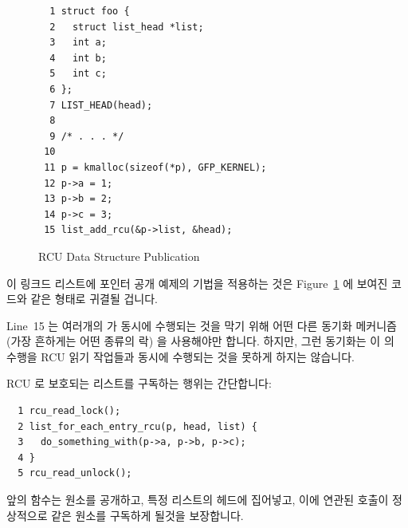 \begin{figure}[tbp]
{ \scriptsize
\begin{verbatim}
  1 struct foo {
  2   struct list_head *list;
  3   int a;
  4   int b;
  5   int c;
  6 };
  7 LIST_HEAD(head);
  8
  9 /* . . . */
 10
 11 p = kmalloc(sizeof(*p), GFP_KERNEL);
 12 p->a = 1;
 13 p->b = 2;
 14 p->c = 3;
 15 list_add_rcu(&p->list, &head);
\end{verbatim}
}
\caption{RCU Data Structure Publication}
\label{fig:defer:RCU Data Structure Publication}
\end{figure}

이 링크드 리스트에 포인터 공개 예제의 기법을 적용하는 것은
Figure~\ref{fig:defer:RCU Data Structure Publication} 에 보여진 코드와 같은
형태로 귀결될 겁니다.

Line~15 는 여러개의  가 동시에 수행되는 것을 막기 위해 어떤
다른 동기화 메커니즘 (가장 흔하게는 어떤 종류의 락) 을 사용해야만 합니다.
하지만, 그런 동기화는 이  의 수행을 RCU 읽기 작업들과 동시에
수행되는 것을 못하게 하지는 않습니다.

RCU 로 보호되는 리스트를 구독하는 행위는 간단합니다:

\vspace{5pt}
\begin{minipage}[t]{\columnwidth}
\scriptsize
\begin{verbatim}
  1 rcu_read_lock();
  2 list_for_each_entry_rcu(p, head, list) {
  3   do_something_with(p->a, p->b, p->c);
  4 }
  5 rcu_read_unlock();
\end{verbatim}
\end{minipage}
\vspace{5pt}

앞의  함수는 원소를 공개하고, 특정 리스트의 헤드에 집어넣고,
이에 연관된  호출이 정상적으로 같은 원소를
구독하게 될것을 보장합니다.
\iffalse

